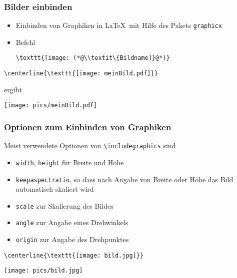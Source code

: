 \begin{frame}[fragile]
  \frametitle{Bilder einbinden}

  \onslide<+->

  \begin{itemize}
  \item Einbinden von Graphiken in \LaTeX\ mit Hilfe des Pakets \texttt{graphicx}
  \item Befehl
\begin{lstlisting}
\texttt{[image: (*@\\textit\{Bildname]}@*)}
\end{lstlisting}
  \end{itemize}

  \onslide<+->

  \begin{Beispiel}
\begin{lstlisting}
\centerline{\texttt{[image: meinBild.pdf]}}
\end{lstlisting}

    ergibt

    \centerline{\texttt{[image: pics/meinBild.pdf]}}
  \end{Beispiel}

\end{frame}

\begin{frame}[fragile]
  \frametitle{Optionen zum Einbinden von Graphiken}

  \onslide<+->

  Meist verwendete Optionen von \lstinline{\includegraphics} sind
  \begin{itemize}
    \item \texttt{width}, \texttt{height} für Breite und Höhe
    \item \texttt{keepaspectratio}, so dass nach Angabe von Breite oder Höhe
      das Bild automatisch skaliert wird
    \item \texttt{scale} zur Skalierung des Bildes
    \item \texttt{angle} zur Angabe eines Drehwinkels
    \item \texttt{origin} zur Angabe des Drehpunktes
  \end{itemize}

  \onslide<+->

  \begin{Beispiel}
\begin{lstlisting}
\centerline{\texttt{[image: bild.jpg]}}
\end{lstlisting}

    \centerline{\texttt{[image: pics/bild.jpg]}}
  \end{Beispiel}

\end{frame}

